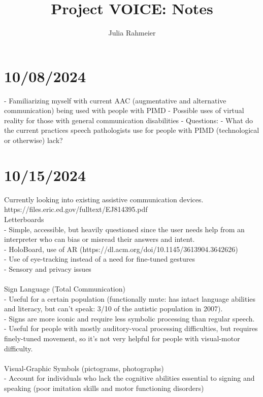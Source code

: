 \documentclass{article}
\author{Julia Rahmeier}
\title{Project VOICE: Notes}
\begin{document}
	
	\maketitle
	
	\section{10/08/2024}
	- Familiarizing myself with current AAC (augmentative and alternative communication) being used with people with PIMD
    - Possible uses of virtual reality for those with general communication disabilities
    - Questions: 
        - What do the current practices speech pathologists use for people with PIMD (technological or otherwise) lack?

	
	\section{10/15/2024}
	Currently looking into existing assistive communication devices. \\
	https://files.eric.ed.gov/fulltext/EJ814395.pdf \\
	
	Letterboards \\
	- Simple, accessible, but heavily questioned since the user needs help from an interpreter who can bias or misread their answers and intent. \\
	- HoloBoard, use of AR (https://dl.acm.org/doi/10.1145/3613904.3642626)\\
    - Use of eye-tracking instead of a need for fine-tuned gestures \\
	- Sensory and privacy issues \\
	\\
	
	Sign Language (Total Communication) \\
	- Useful for a certain population (functionally mute: has intact language abilities and literacy, but can’t speak:  3/10 of the autistic population in 2007). \\
	- Signs are more iconic and require less symbolic processing than regular speech. \\
	- Useful for people with mostly auditory-vocal processing difficulties, but requires finely-tuned movement, so it’s not very helpful for people with visual-motor difficulty. \\
	\\
	
	Visual-Graphic Symbols (pictograms, photographs) \\
	- Account for individuals who lack the cognitive abilities essential to signing and speaking (poor imitation skills and motor functioning disorders) \\
	\\
	
\end{document}
